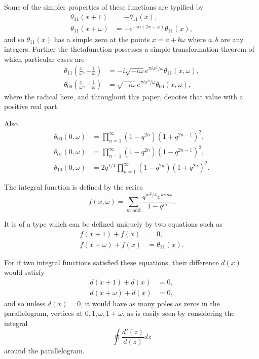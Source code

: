\documentclass[12pt]{article}
\theoremstyle{remark}
\begin{document}
Some of the simpler properties of these functions are typified by
\begin{align}
\theta_{11}(x + 1) &= -\theta_{11}(x), \label{eq:theta_prop1}\\
\theta_{11}(x + \omega) &= -e^{-\pi i(2x+\omega)} \theta_{11}(x), \label{eq:theta_prop2}
\end{align}
and so $\theta_{11}(x)$ has a simple zero at the points $x = a + b\omega$ where $a, b$ are any integers. Further the thetafunction possesses a simple transformation theorem of which particular cases are
\begin{align}
\theta_{11}\left(\frac{x}{\omega}, -\frac{1}{\omega}\right) &= -i\sqrt{-i\omega} e^{\pi ix^2/\omega} \theta_{11}(x, \omega), \label{eq:theta_transform1}\\
\theta_{00}\left(\frac{x}{\omega}, -\frac{1}{\omega}\right) &= \sqrt{-i\omega} e^{\pi ix^2/\omega} \theta_{00}(x, \omega), \label{eq:theta_transform2}
\end{align}
where the radical here, and throughout this paper, denotes that value with a positive real part.

Also
\begin{align}
\theta_{00}(0, \omega) &= \prod_{n=1}^\infty (1-q^{2n})(1+q^{2n-1})^2, \label{eq:theta_product1}\\
\theta_{01}(0, \omega) &= \prod_{n=1}^\infty (1-q^{2n})(1-q^{2n-1})^2, \label{eq:theta_product2}\\
\theta_{10}(0, \omega) &= 2q^{1/4} \prod_{n=1}^\infty (1-q^{2n})(1+q^{2n})^2. \label{eq:theta_product3}
\end{align}

The integral function is defined by the series
\begin{equation}\label{eq:integral_function}
f(x, \omega) = \sum_{m \text{ odd}} \frac{q^{m^2/4} e^{\pi imx}}{1 - q^m}.
\end{equation}

It is of a type which can be defined uniquely by two equations such as
\begin{align}
f(x + 1) + f(x) &= 0, \label{eq:functional_eq_1}\\
f(x + \omega) + f(x) &= \theta_{11}(x). \label{eq:functional_eq_2}
\end{align}

For if two integral functions satisfied these equations, their difference $d(x)$ would satisfy
\begin{align}
d(x + 1) + d(x) &= 0, \label{eq:diff_eq1}\\
d(x + \omega) + d(x) &= 0, \label{eq:diff_eq2}
\end{align}
and so unless $d(x) = 0$, it would have as many poles as zeros in the parallelogram, vertices at $0, 1, \omega, 1+\omega$, as is easily seen by considering the integral
\begin{equation}\label{eq:residue_integral}
\oint \frac{d'(z)}{d(z)} dz
\end{equation}
around the parallelogram.
\end{document}
